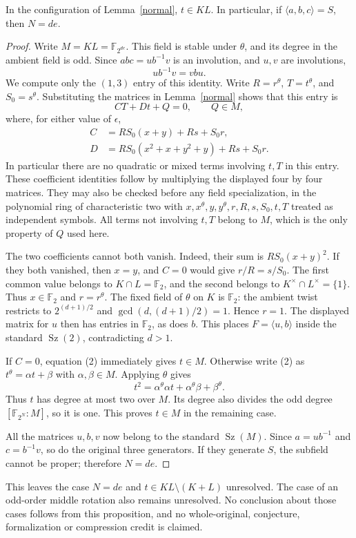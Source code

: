 \documentclass[11pt,a4paper]{article}
\newcommand{\Sz}{\operatorname{Sz}}
\begin{document}
\begin{proposition}\label{descent}
In the configuration of Lemma~\ref{normal}, $t\in KL$. In particular,
if $\langle a,b,c\rangle=S$, then $N=de$.
\end{proposition}
\begin{proof}
Write $M=KL=\mathbb F_{2^{de}}$. This field is stable under
$\theta$, and its degree in the ambient field is odd. Since
$abc=ub^{-1}v$ is an involution, and $u,v$ are involutions,
\[
 ub^{-1}v=vbu.                                           \tag{1}
\]
We compute only the $(1,3)$ entry of this identity. Write
$R=r^\theta$, $T=t^\theta$, and $S_0=s^\theta$.
Substituting the matrices in Lemma~\ref{normal} shows that this entry
is
\[
 CT+Dt+Q=0,\qquad Q\in M,                               \tag{2}
\]
where, for either value of $\epsilon$,
\begin{align*}
 C&=RS_0(x+y)+Rs+S_0r,\\
 D&=RS_0(x^2+x+y^2+y)+Rs+S_0r.
\end{align*}
In particular there are no quadratic or mixed terms involving $t,T$
in this entry. These coefficient identities follow by multiplying the
displayed four by four matrices. They may also be checked before any
field specialization, in the polynomial ring of characteristic two
with $x,x^\theta,y,y^\theta,r,R,s,S_0,t,T$ treated as independent
symbols. All terms not involving $t,T$ belong to $M$, which is the
only property of $Q$ used here.

The two coefficients cannot both vanish. Indeed, their sum is
$RS_0(x+y)^2$. If they both vanished, then $x=y$, and $C=0$ would
give $r/R=s/S_0$. The first common value belongs to
$K\cap L=\mathbb F_2$, and the second belongs to
$K^\times\cap L^\times=\{1\}$. Thus $x\in\mathbb F_2$ and
$r=r^\theta$. The fixed field of $\theta$ on $K$ is
$\mathbb F_2$: the ambient twist restricts to
$2^{(d+1)/2}$ and $\gcd(d,(d+1)/2)=1$. Hence $r=1$.
The displayed matrix for $u$ then has entries in $\mathbb F_2$,
as does $b$. This places $F=\langle u,b\rangle$ inside the standard
$\Sz(2)$, contradicting $d>1$.

If $C=0$, equation (2) immediately gives $t\in M$.
Otherwise write (2) as $t^\theta=\alpha t+\beta$ with
$\alpha,\beta\in M$. Applying $\theta$ gives
\[
 t^2=\alpha^\theta\alpha t+
       \alpha^\theta\beta+\beta^\theta.
\]
Thus $t$ has degree at most two over $M$. Its degree also divides the
odd degree $[\mathbb F_{2^N}:M]$, so it is one. This proves
$t\in M$ in the remaining case.

All the matrices $u,b,v$ now belong to the standard $\Sz(M)$.
Since $a=ub^{-1}$ and $c=b^{-1}v$, so do the original three
generators. If they generate $S$, the subfield cannot be proper;
therefore $N=de$.
\end{proof}

This leaves the case $N=de$ and $t\in KL\setminus(K+L)$ unresolved.
The case of an odd-order middle rotation also remains unresolved. No conclusion
about those cases follows from this proposition, and no whole-original,
conjecture, formalization or compression credit is claimed.
\end{document}
